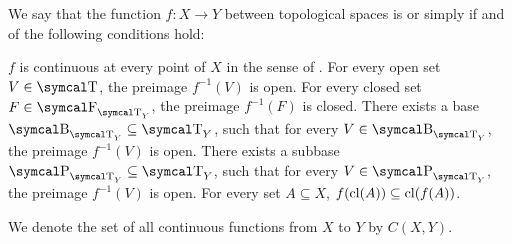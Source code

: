 \begin{definition}\label{def:continuous_function}
  We say that the function \( f: X \to Y \) between topological spaces is  or simply  if and of the following conditions hold:
  \begin{defenum}
     \( f \) is continuous at every point of \( X \) in the sense of .
     For every open set \( V \in \CT \), the preimage \( f^{-1}(V) \) is open.
     For every closed set \( F \in \CF_{\CT_Y} \), the preimage \( f^{-1}(F) \) is closed.
     There exists a base \( \CB_{\CT_Y} \subseteq \CT_Y \), such that for every \( V \in \CB_{\CT_Y} \), the preimage \( f^{-1}(V) \) is open.
     There exists a subbase \( \CP_{\CT_Y} \subseteq \CT_Y \), such that for every \( V \in \CP_{\CT_Y} \), the preimage \( f^{-1}(V) \) is open.
     For every set \( A \subseteq X \), \( f(\operatorname{cl}(A)) \subseteq \operatorname{cl}(f(A)) \).
  \end{defenum}

  We denote the set of all continuous functions from \( X \) to \( Y \) by \( C(X, Y) \).
\end{definition}

